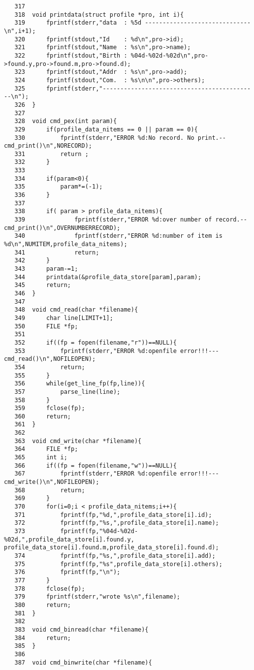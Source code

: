 \documentclass[a4j,11pt]{jarticle}
\begin{document}
{\begin{verbatim}
   317	
   318	void printdata(struct profile *pro, int i){
   319	    fprintf(stderr,"data  : %5d ------------------------------\n",i+1);
   320	    fprintf(stdout,"Id    : %d\n",pro->id);
   321	    fprintf(stdout,"Name  : %s\n",pro->name);
   322	    fprintf(stdout,"Birth : %04d-%02d-%02d\n",pro->found.y,pro->found.m,pro->found.d);
   323	    fprintf(stdout,"Addr  : %s\n",pro->add);
   324	    fprintf(stdout,"Com.  : %s\n\n",pro->others);
   325	    fprintf(stderr,"--------------------------------------------\n");
   326	}
   327	
   328	void cmd_pex(int param){
   329	    if(profile_data_nitems == 0 || param == 0){
   330	        fprintf(stderr,"ERROR %d:No record. No print.--cmd_print()\n",NORECORD);
   331	        return ;
   332	    }
   333	
   334	    if(param<0){
   335	        param*=(-1);
   336	    }
   337	
   338	    if( param > profile_data_nitems){
   339	            fprintf(stderr,"ERROR %d:over number of record.--cmd_print()\n",OVERNUMBERRECORD);
   340	            fprintf(stderr,"ERROR %d:number of item is %d\n",NUMITEM,profile_data_nitems);
   341	            return;
   342	    }
   343	    param-=1;
   344	    printdata(&profile_data_store[param],param);
   345	    return;
   346	}
   347	
   348	void cmd_read(char *filename){
   349	    char line[LIMIT+1];
   350	    FILE *fp;
   351	    
   352	    if((fp = fopen(filename,"r"))==NULL){
   353	        fprintf(stderr,"ERROR %d:openfile error!!!---cmd_read()\n",NOFILEOPEN);
   354	        return;
   355	    }
   356	    while(get_line_fp(fp,line)){
   357	        parse_line(line);
   358	    }
   359	    fclose(fp);
   360	    return;
   361	}
   362	
   363	void cmd_write(char *filename){
   364	    FILE *fp;
   365	    int i;
   366	    if((fp = fopen(filename,"w"))==NULL){
   367	        fprintf(stderr,"ERROR %d:openfile error!!!---cmd_write()\n",NOFILEOPEN);
   368	        return;
   369	    }
   370	    for(i=0;i < profile_data_nitems;i++){
   371	        fprintf(fp,"%d,",profile_data_store[i].id);
   372	        fprintf(fp,"%s,",profile_data_store[i].name);
   373	        fprintf(fp,"%04d-%02d-%02d,",profile_data_store[i].found.y,
profile_data_store[i].found.m,profile_data_store[i].found.d);
   374	        fprintf(fp,"%s,",profile_data_store[i].add);
   375	        fprintf(fp,"%s",profile_data_store[i].others);
   376	        fprintf(fp,"\n");
   377	    }
   378	    fclose(fp);
   379	    fprintf(stderr,"wrote %s\n",filename);
   380	    return;
   381	}
   382	
   383	void cmd_binread(char *filename){
   384	    return;    
   385	}
   386	
   387	void cmd_binwrite(char *filename){

\end{verbatim}}
\end{document}
